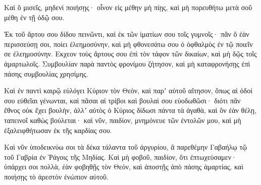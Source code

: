{Καὶ ὃ μισεῖς, μηδενὶ ποιήσῃς· οἶνον εἰς μέθην μὴ πίῃς, καὶ μὴ πορευθήτω μετὰ σοῦ μέθη ἐν τῇ ὁδῷ σου.
\par }{\PP {}Ἐκ τοῦ ἄρτου σου δίδου πεινῶντι, καὶ ἐκ τῶν ἱματίων σου τοῖς γυμνοῖς· πᾶν ὃ ἐὰν περισσεύσῃ σοι, ποίει ἐλεημοσύνην, καὶ μὴ φθονεσάτω σου ὁ ὀφθαλμὸς ἐν τῷ ποιεῖν σε ἐλεημοσύνην.
Εκχεον τοὺς ἄρτους σου ἐπὶ τὸν τάφον τῶν δικαίων, καὶ μὴ δῷς τοῖς ἁμαρτωλοῖς.
Συμβουλίαν παρὰ παντὸς φρονίμου ζήτησον, καὶ μὴ καταφρονήσῃς ἐπὶ πάσης συμβουλίας χρησίμης.
\par }{\PP {}Καὶ ἐν παντὶ καιρῷ εὐλόγει Κύριον τὸν Θεὸν, καὶ παρʼ αὐτοῦ αἴτησον, ὅπως αἱ ὁδοί σου εὐθεῖαι γένωνται, καὶ πᾶσαι αἱ τρίβοι καὶ βουλαὶ σου εὐοδωθῶσι· διότι πᾶν ἔθνος οὐκ ἔχει βουλὴν, ἀλλʼ αὐτὸς ὁ Κύριος δίδωσι πάντα τὰ ἀγαθὰ, καὶ ὃν ἐὰν θέλῃ, ταπεινοῖ καθὼς βούλεται· καὶ νῦν, παιδίον, μνημόνευε τῶν ἐντολῶν μου, καὶ μὴ ἐξαλειφθήτωσαν ἐκ τῆς καρδίας σου.
\par }{\PP {}Καὶ νῦν ὑποδεικνύω σοι τὰ δέκα τάλαντα τοῦ ἀργυρίου, ἃ παρεθέμην Γαβαήλῳ τῷ τοῦ Γαβρία ἐν Ῥάγοις τῆς Μηδίας.
Καὶ μὴ φοβοῦ, παιδίον, ὅτι ἐπτωχεύσαμεν· ὑπάρχει σοι πολλὰ, ἐὰν φοβηθῇς τὸν Θεὸν, καὶ ἀποστῇς ἀπὸ πάσης ἁμαρτίας, καὶ ποιήσῃς τὸ ἀρεστὸν ἐνώπιον αὐτοῦ.

}
